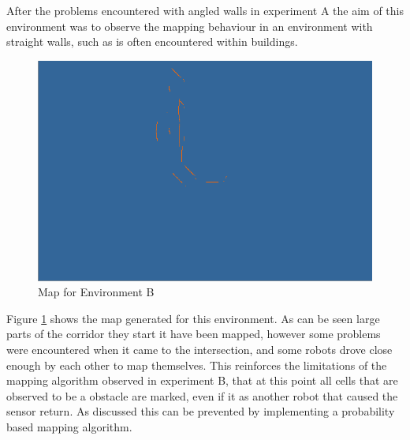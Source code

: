 After the problems encountered with angled walls in experiment A the aim of this environment was to observe the mapping behaviour in an environment with straight walls, such as is often encountered within buildings. 

\begin{figure}[h]
\centering
\includegraphics[scale=0.4]{Chapter4/images/experiment_2_map.png}
\caption{Map for Environment B}
\label{fig:experiment_b_map}
\end{figure}

Figure \ref{fig:experiment_b_map} shows the map generated for this environment. 
As can be seen large parts of the corridor they start it have been mapped, however some problems were encountered when it came to the intersection, and some robots drove close enough by each other to map themselves.
This reinforces the limitations of the mapping algorithm observed in experiment B, that at this point all cells that are observed to be a obstacle are marked, even if it as another robot that caused the sensor return. 
As discussed this can be prevented by implementing a probability based mapping algorithm.\\

